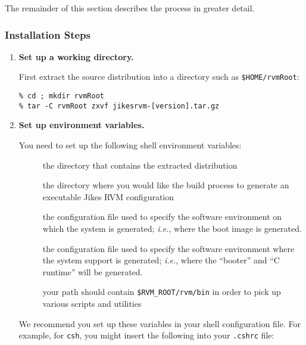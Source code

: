 The remainder of this section describes the process in greater detail.

\subsubsection{Installation Steps}%
\label{sub-sub-sec:InstallationSteps}%
\label{sec:manual-classpath-root}%
\label{single-virtual-processor-subsubsection}

\begin{enumerate}
\item {\bf Set up a working directory.}

First extract the \jrvm{} source distribution into a
directory such as  
\texttt{\$HOME/rvmRoot}:
\begin{verbatim}
% cd ; mkdir rvmRoot
% tar -C rvmRoot zxvf jikesrvm-[version].tar.gz 
\end{verbatim}

%
\item {\bf Set up environment variables.}

You need to set up the following shell environment variables:

\begin{description}

\item[] the directory that contains
  the extracted distribution

\item[]
the directory where you would like the build
process to generate an executable Jikes RVM configuration

\item[]
the configuration file used to specify
the software environment on which the system is generated; {\it i.e.}, where the
boot image is generated.  

\item[] the
configuration file used to specify the software environment where the
system support is generated; {\it i.e.}, where the ``booter'' and ``C
runtime'' will be generated. 

\item[] your path should contain \texttt{\$RVM\_\-ROOT/\-rvm/\-bin} in
order to pick up various scripts and utilities

\end{description}

We recommend you set up these variables in your shell configuration
file.  For example, for \texttt{csh}, you might insert the
following into your \texttt{.cshrc} file:


\end{enumerate}
